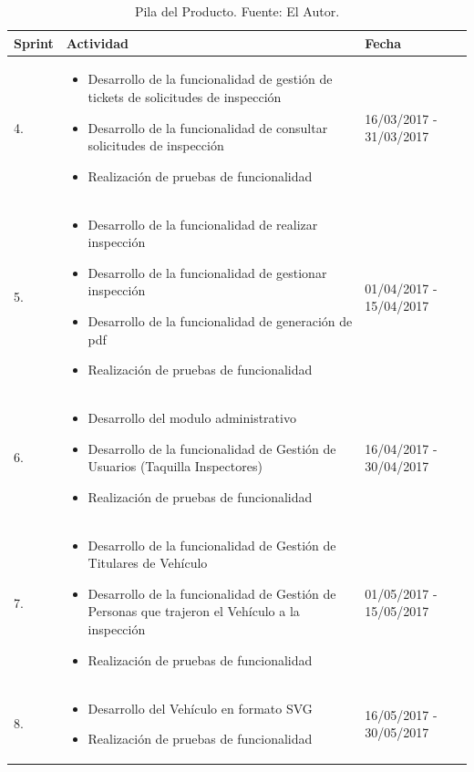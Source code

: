 \begin{table}[H]	
\begin{center}
\begin{tabular}{ | m{2cm} | m{9cm}| m{3cm}| } 
 \hline
 Sprint & Actividad & Fecha \\
 \hline
 4.
 & 
 \begin{itemize}
 	\item Desarrollo de la funcionalidad de gestión de tickets de solicitudes de inspección
 	\item Desarrollo de la funcionalidad de consultar solicitudes de inspección
 	\item Realización de pruebas de funcionalidad
 \end{itemize}
 & 
 16/03/2017 - 31/03/2017\\
 \hline
  5. 
 & 
 \begin{itemize}
 	\item Desarrollo de la funcionalidad de realizar inspección
 	\item Desarrollo de la funcionalidad de gestionar inspección
 	\item Desarrollo de la funcionalidad de generación de pdf
 	\item Realización de pruebas de funcionalidad
 \end{itemize}
 & 
 01/04/2017 - 15/04/2017\\
 \hline
6. 
 & 
 \begin{itemize}
 	\item Desarrollo del modulo administrativo
 	\item Desarrollo de la funcionalidad de Gestión de Usuarios (Taquilla Inspectores)
 	\item Realización de pruebas de funcionalidad
 \end{itemize}
 & 
 16/04/2017 - 30/04/2017\\
 \hline

 7. 
 & 
 \begin{itemize}
 	\item Desarrollo de la funcionalidad de Gestión de Titulares de Vehículo
 	\item Desarrollo de la funcionalidad de Gestión de Personas que trajeron el Vehículo a la inspección
 	\item Realización de pruebas de funcionalidad
 \end{itemize}
 & 
 01/05/2017 - 15/05/2017\\
 \hline

 8.
 & 
 \begin{itemize}
 	\item Desarrollo del Vehículo en formato SVG
 	\item Realización de pruebas de funcionalidad
 \end{itemize}
 &
 16/05/2017 - 30/05/2017\\
 \hline

\end{tabular}
\caption{Pila del Producto. Fuente: El Autor.}
\label{Tabla:16}
\end{center}
\end{table}	






